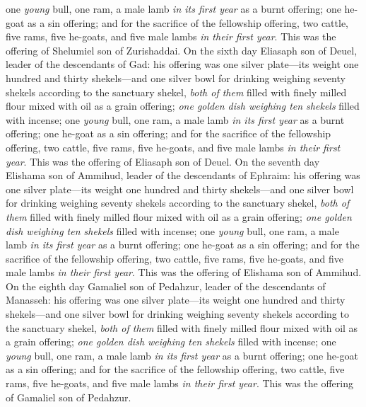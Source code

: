 \begin{biblechapter}
\verse one \textit{young} bull, one ram, a male lamb \textit{in its first year} as a burnt offering;
\verse one he-goat as a sin offering;
\verse and for the sacrifice of the fellowship offering, two cattle, five rams, five he-goats, and five male lambs \textit{in their first year}. This was the offering of Shelumiel son of Zurishaddai.
\verse On the sixth day Eliasaph son of Deuel, leader of the descendants of Gad:
\verse his offering was one silver plate—its weight one hundred and thirty shekels—and one silver bowl for drinking weighing seventy shekels according to the sanctuary shekel, \textit{both of them} filled with finely milled flour mixed with oil as a grain offering;
\verse \textit{one golden dish weighing ten shekels} filled with incense;
\verse one \textit{young} bull, one ram, a male lamb \textit{in its first year} as a burnt offering;
\verse one he-goat as a sin offering;
\verse and for the sacrifice of the fellowship offering, two cattle, five rams, five he-goats, and five male lambs \textit{in their first year}. This was the offering of Eliasaph son of Deuel.
\verse On the seventh day Elishama son of Ammihud, leader of the descendants of Ephraim:
\verse his offering was one silver plate—its weight one hundred and thirty shekels—and one silver bowl for drinking weighing seventy shekels according to the sanctuary shekel, \textit{both of them} filled with finely milled flour mixed with oil as a grain offering;
\verse \textit{one golden dish weighing ten shekels} filled with incense;
\verse one \textit{young} bull, one ram, a male lamb \textit{in its first year} as a burnt offering;
\verse one he-goat as a sin offering;
\verse and for the sacrifice of the fellowship offering, two cattle, five rams, five he-goats, and five male lambs \textit{in their first year}. This was the offering of Elishama son of Ammihud.
\verse On the eighth day Gamaliel son of Pedahzur, leader of the descendants of Manasseh:
\verse his offering was one silver plate—its weight one hundred and thirty shekels—and one silver bowl for drinking weighing seventy shekels according to the sanctuary shekel, \textit{both of them} filled with finely milled flour mixed with oil as a grain offering;
\verse \textit{one golden dish weighing ten shekels} filled with incense;
\verse one \textit{young} bull, one ram, a male lamb \textit{in its first year} as a burnt offering;
\verse one he-goat as a sin offering;
\verse and for the sacrifice of the fellowship offering, two cattle, five rams, five he-goats, and five male lambs \textit{in their first year}. This was the offering of Gamaliel son of Pedahzur.

\end{biblechapter}
